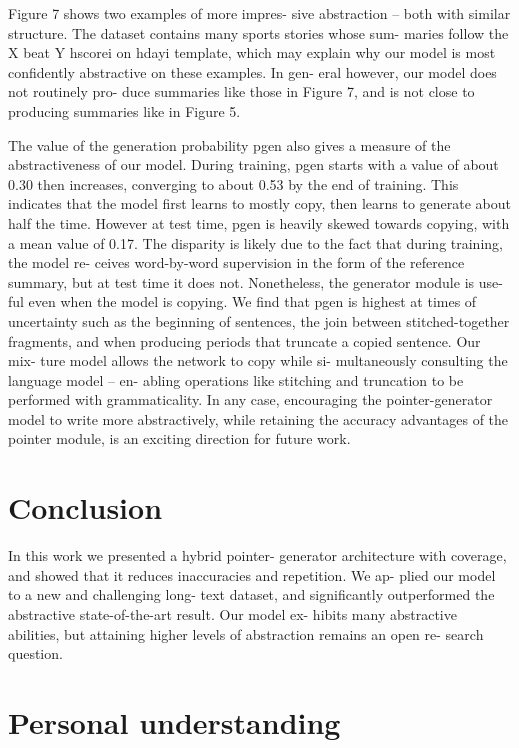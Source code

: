 \documentclass[UTF8]{ctexart}
\begin{document}
Figure 7 shows two examples of more impres-
sive abstraction – both with similar structure. The
dataset contains many sports stories whose sum-
maries follow the X beat Y hscorei on hdayi template, which may explain why our model is most
confidently abstractive on these examples. In gen-
eral however, our model does not routinely pro-
duce summaries like those in Figure 7, and is not
close to producing summaries like in Figure 5.


The value of the generation probability pgen
also gives a measure of the abstractiveness of our
model. During training, pgen starts with a value
of about 0.30 then increases, converging to about
0.53 by the end of training. This indicates that
the model first learns to mostly copy, then learns
to generate about half the time. However at test
time, pgen is heavily skewed towards copying, with
a mean value of 0.17. The disparity is likely
due to the fact that during training, the model re-
ceives word-by-word supervision in the form of
the reference summary, but at test time it does
not. Nonetheless, the generator module is use-
ful even when the model is copying. We find
that pgen is highest at times of uncertainty such
as the beginning of sentences, the join between
stitched-together fragments, and when producing
periods that truncate a copied sentence. Our mix-
ture model allows the network to copy while si-
multaneously consulting the language model – en-
abling operations like stitching and truncation to
be performed with grammaticality. In any case,
encouraging the pointer-generator model to write
more abstractively, while retaining the accuracy
advantages of the pointer module, is an exciting
direction for future work.


    \section{Conclusion}

    In this work we presented a hybrid pointer-
generator architecture with coverage, and showed
that it reduces inaccuracies and repetition. We ap-
plied our model to a new and challenging long-
text dataset, and significantly outperformed the
abstractive state-of-the-art result. Our model ex-
hibits many abstractive abilities, but attaining
higher levels of abstraction remains an open re-
search question.



    \section{Personal understanding}
\end{document}
